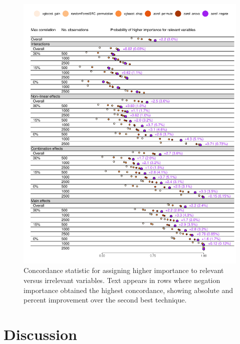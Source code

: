 \documentclass[twoside,11pt]{article}\usepackage[]{graphicx}\usepackage[]{xcolor}
\makeatletter
\def\maxwidth{ %
  \ifdim\Gin@nat@width>\linewidth
    \linewidth
  \else
    \Gin@nat@width
  \fi
}
\newenvironment{knitrout}{}{} %
\makeatother
\begin{document}
\begin{knitrout}
\color{fgcolor}\begin{figure}
\includegraphics[width=\maxwidth]{figure/bm_vi_viz-1} \caption[Concordance statistic for assigning higher importance to relevant versus irrelevant variables]{Concordance statistic for assigning higher importance to relevant versus irrelevant variables. Text appears in rows where negation importance obtained the highest concordance, showing absolute and percent improvement over the second best technique.}\label{fig:bm_vi_viz}
\end{figure}

\end{knitrout}


\section{Discussion}
\end{document}
